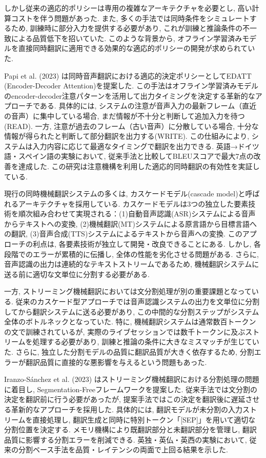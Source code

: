 しかし従来の適応的ポリシーは専用の複雑なアーキテクチャを必要とし, 高い計算コストを伴う問題があった.
また, 多くの手法では同時条件をシミュレートするため, 訓練時に部分入力を提供する必要があり, これが訓練と推論条件の不一致による品質低下を招いていた.
このような背景から, オフライン学習済みモデルを直接同時翻訳に適用できる効果的な適応的ポリシーの開発が求められていた.

Papi et al. (2023) \cite{papi2023attention}は同時音声翻訳における適応的決定ポリシーとしてEDATT (Encoder-Decoder Attention)を提案した.
この手法はオフライン学習済みモデルのencoder-decoder注意パターンを活用して出力タイミングを決定する革新的なアプローチである.
具体的には, システムの注意が音声入力の最新フレーム（直近の音声）に集中している場合, まだ情報が不十分と判断して追加入力を待つ(READ).
一方, 注意が過去のフレーム（古い音声）に分散している場合, 十分な情報が得られたと判断して部分翻訳を出力する(WRITE).
この仕組みにより, システムは入力内容に応じて最適なタイミングで翻訳を出力できる.
英語→ドイツ語・スペイン語の実験において, 従来手法と比較してBLEUスコアで最大7点の改善を達成した.
この研究は注意機構を利用した適応的同時翻訳の有効性を実証している.

現行の同時機械翻訳システムの多くは, カスケードモデル(cascade model)と呼ばれるアーキテクチャを採用している.
カスケードモデルは3つの独立した要素技術を順次組み合わせて実現される：(1)自動音声認識(ASR)システムによる音声からテキストへの変換, (2)機械翻訳(MT)システムによる原言語から目標言語への翻訳, (3)音声合成(TTS)システムによるテキストから音声への変換.
このアプローチの利点は, 各要素技術が独立して開発・改良できることにある.
しかし, 各段階でのエラーが累積的に伝播し, 全体の性能を劣化させる問題がある.
さらに, 音声認識の出力は連続的なテキストストリームであるため, 機械翻訳システムに送る前に適切な文単位に分割する必要がある.

一方, ストリーミング機械翻訳においては文分割処理が別の重要課題となっている.
従来のカスケード型アプローチでは音声認識システムの出力を文単位に分割してから翻訳システムに送る必要があり, この中間的な分割ステップがシステム全体のボトルネックとなっていた.
特に, 機械翻訳システムは通常数百トークンの文で訓練されているが, 実際のライブセッションでは数千トークンに及ぶストリームを処理する必要があり, 訓練と推論の条件に大きなミスマッチが生じていた.
さらに, 独立した分割モデルの品質に翻訳品質が大きく依存するため, 分割エラーが翻訳品質に直接的な悪影響を与えるという問題もあった.

Iranzo-Sánchez et al. (2023) \cite{iranzo2023segmentation}はストリーミング機械翻訳における分割処理の問題に着目し, Segmentation-Freeフレームワークを提案した.
従来手法では文分割の決定を翻訳前に行う必要があったが, 提案手法ではこの決定を翻訳後に遅延させる革新的なアプローチを採用した.
具体的には, 翻訳モデルが未分割の入力ストリームを直接処理し, 翻訳生成と同時に特別トークン「[SEP]」を用いて適切な分割位置を決定する.
メモリ機構により既翻訳部分と未翻訳部分を管理し, 翻訳品質に影響する分割エラーを削減できる.
英独・英仏・英西の実験において, 従来の分割ベース手法を品質・レイテンシの両面で上回る結果を示した.


